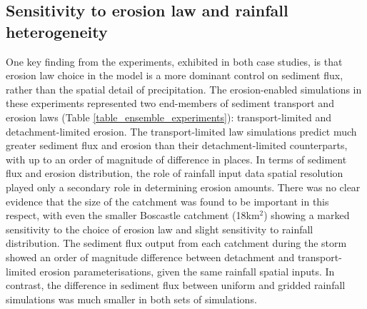 \subsection{Sensitivity to erosion law and rainfall heterogeneity} 
One key finding from the experiments, exhibited in both case studies, is that erosion law choice in the model is a more dominant control on sediment flux, rather than the spatial detail of precipitation. The erosion-enabled simulations in these experiments represented two end-members of sediment transport and erosion laws (Table \ref{table_ensemble_experiments}): transport-limited and detachment-limited erosion. The transport-limited law simulations predict much greater sediment flux and erosion than their detachment-limited counterparts, with up to an order of magnitude of difference in places. In terms of sediment flux and erosion distribution, the role of rainfall input data spatial resolution played only a secondary role in determining erosion amounts. There was no clear evidence that the size of the catchment was found to be important in this respect, with even the smaller Boscastle catchment (18km\(^2\)) showing a marked sensitivity to the choice of erosion law and slight sensitivity to rainfall distribution. The sediment flux output from each catchment during the storm showed an order of magnitude difference between detachment and transport-limited erosion parameterisations, given the same rainfall spatial inputs. In contrast, the difference in sediment flux between uniform and gridded rainfall simulations was much smaller in both sets of simulations.

